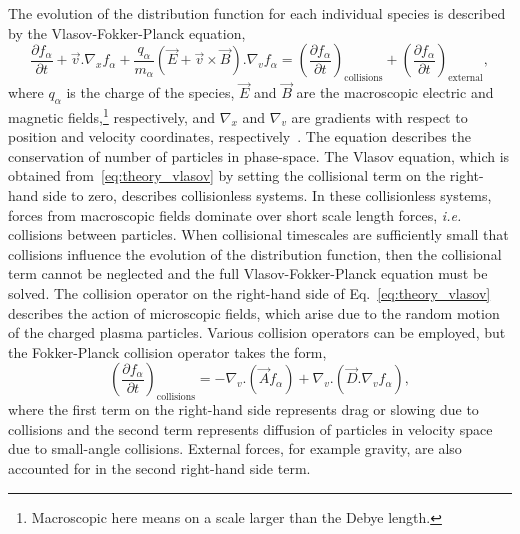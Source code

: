 The evolution of the distribution function for each individual species is described by the Vlasov-Fokker-Planck equation,
\begin{equation}
    \label{eq:theory_vlasov}
    \frac{\partial f_\alpha}{\partial t} + \vec{v}.\nabla_x f_\alpha + \frac{q_\alpha}{m_\alpha} (\vec{E} + \vec{v}\times\vec{B}) . \nabla_v f_\alpha = \left ( \frac{\partial f_\alpha}{\partial t} \right )_\text{collisions} + \left ( \frac{\partial f_\alpha}{\partial t} \right )_\text{external},
\end{equation}
where $q_\alpha$ is the charge of the species, $\vec{E}$ and $\vec{B}$ are the macroscopic electric and magnetic fields,\footnote{Macroscopic here means on a scale larger than the Debye length.} respectively, and $\nabla_x$ and $\nabla_v$ are gradients with respect to position and velocity coordinates, respectively~\cite{bittencourt_fundamentals_2004}.
The equation describes the conservation of number of particles in phase-space.
The Vlasov equation, which is obtained from~\ref{eq:theory_vlasov} by setting the collisional term on the right-hand side to zero, describes collisionless systems.
In these collisionless systems, forces from macroscopic fields dominate over short scale length forces, \textit{i.e.} collisions between particles.
When collisional timescales are sufficiently small that collisions influence the evolution of the distribution function, then the collisional term cannot be neglected and the full Vlasov-Fokker-Planck equation must be solved.
The collision operator on the right-hand side of Eq.~\ref{eq:theory_vlasov} describes the action of microscopic fields, which arise due to the random motion of the charged plasma particles.
Various collision operators can be employed, but the Fokker-Planck collision operator takes the form,
\begin{equation}
    \left ( \frac{\partial f_\alpha}{\partial t} \right )_\text{collisions} = - \nabla_v. (\vec{A} f_{\alpha}) + \nabla_v. (\vec{D}. \nabla_v f_{\alpha}),
\end{equation}
where the first term on the right-hand side represents drag or slowing due to collisions and the second term represents diffusion of particles in velocity space due to small-angle collisions.
External forces, for example gravity, are also accounted for in the second right-hand side term.


